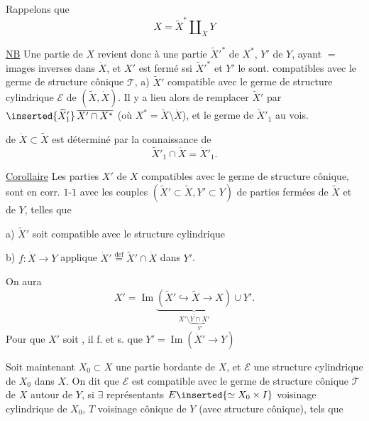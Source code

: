 
Rappelons que
\[
X=\widetilde X^*\amalg_{\dot X}Y
\]

\uline{NB} Une partie  de $X$ revient donc à une
partie $\widetilde X'^*$ de $X^*$, $Y'$ de $Y$, ayant $=$
images inverses dans $\dot X$, et $X'$ est fermé ssi
$\widetilde X'^*$ et $Y'$ le sont. 
compatibles avec le germe de structure
cônique $\mathcal T$, 
a) $\widetilde X'$ compatible avec le germe de structure
cylindrique $\mathcal E$ de $(\widetilde X,\dot X)$.
Il y a lieu alors de remplacer $\widetilde X'$ par
$\inserted{\widetilde X'_1}\,\overline{X'\cap X^*}$
(où $X^*=\widetilde X\setminus\dot X$), et le germe de $\widetilde X'_1$ au vois.

de $\dot X\subset\widetilde X$ est déterminé par la connaissance de
\[
\widetilde X'_1\cap\dot X=\dot X'_1.
\]

\uline{Corollaire} Les parties  $X'$ de $X$ compatibles avec
le germe de structure cônique, sont en
corr. $1$-$1$ avec les couples $(\widetilde X'\subset\widetilde X,Y'\subset Y)$
de parties fermées de $\widetilde X$ et de $Y$, telles que

a) $\widetilde X'$ soit compatible avec le  structure cylindrique

b) $f:\dot X\to Y$ applique 
$\dot X'\overset{\mathrm{def}}=\widetilde X'\cap\dot X$ dans $Y'$.

On aura
\[
X'=\operatorname{Im}\underbrace{(\widetilde X'\hookrightarrow\widetilde X\to X)}
_{\overline{X'\setminus\underbrace{Y\cap X'}_{Y'}}}\cup Y'.
\]
Pour que $X'$ soit 
,
il f. et s. que $Y'=\operatorname{Im}(\dot X'\to Y)$

Soit maintenant $X_0\subset X$ une partie
bordante de $X$, et $\mathcal E$ une  structure cylindrique
de $X_0$ dans $X$. On dit que $\mathcal E$ est compatible
avec le germe de structure cônique $\mathcal T$
de $X$ autour de $Y$, si $\exists$ représentants
$E\inserted{\simeq X_0\times I}$ voisinage cylindrique de $X_0$,  $T$ voisinage
cônique de $Y$ (avec  structure cônique), tels que

